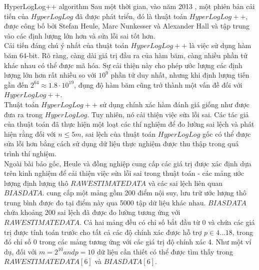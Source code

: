 \documentclass[10pt]{beamer}
\begin{document}
\begin{frame}{HyperLogLog++ algorithm}
  Sau một thời gian, vào năm 2013 \cite{chabchoub2010sliding}, một phiên bản cải tiến của $HyperLogLog$ đã được phát triển, 
  đó là thuật toán $HyperLogLog++$, được công bố bởi Stefan Heule, Marc Nunkesser và Alexander Hall và tập trung vào 
  các định lượng lớn hơn và sửa lỗi sai tốt hơn.\\
  
  Cải tiến đáng chú ý nhất của thuật toán $HyperLogLog++$ là việc sử dụng hàm băm 64-bit. Rõ ràng, 
  càng dài giá trị đầu ra của hàm băm, càng nhiều phần tử khác nhau có thể được mã hóa. Sự cải thiện này cho phép ước lượng 
  các định lượng lớn hơn rất nhiều so với $10^9$ phần tử duy nhất, nhưng khi định lượng tiến gần đến $2^64 \approx 1.8\cdot 10^{19}$, 
  đụng độ hàm băm cũng trở thành một vấn đề đối với $HyperLogLog++$.\\
  
  Thuật toán $HyperLogLog++$ sử dụng chính xác hàm đánh giá giống như được đưa ra trong $HyperLogLog$. Tuy nhiên, nó cải thiện việc sửa lỗi sai. 
  Các tác giả của thuật toán đã thực hiện một loạt các thí nghiệm để đo lường sai lệch và phát hiện rằng đối với $n \le 5m$, 
  sai lệch của thuật toán $HyperLogLog$ gốc có thể được sửa lỗi hơn bằng cách sử dụng dữ liệu thực nghiệm được thu thập trong quá trình thí nghiệm.\\
  
  Ngoài bài báo gốc, Heule và đồng nghiệp cung cấp các giá trị được xác định dựa trên kinh nghiệm 
  để cải thiện việc sửa lỗi sai trong thuật toán - các mảng ước lượng định lượng thô $RAWESTIMATEDATA$ và 
  các sai lệch liên quan $BIASDATA$. cung cấp một mảng gồm 200 điểm nội suy, lưu trữ ước lượng thô trung bình được đo tại điểm này 
  qua 5000 tập dữ liệu khác nhau. $BIASDATA$ chứa khoảng 200 sai lệch đã được đo lường tương ứng với $RAWESTIMATEDATA$. 
  Cả hai mảng đều có chỉ số bắt đầu từ 0 và chứa các giá trị được tính toán trước cho tất cả các độ chính xác được hỗ trợ $p \in 4...18$,
  trong đó chỉ số 0 trong các mảng tương ứng với các giá trị độ chính xác 4. Như một ví dụ, đối với $m = 2^{10} and p = 10$ 
  dữ liệu cần thiết có thể được tìm thấy trong $RAWESTIMATEDATA[6]$ và $BIASDATA[6]$.
\end{frame}
\end{document}

